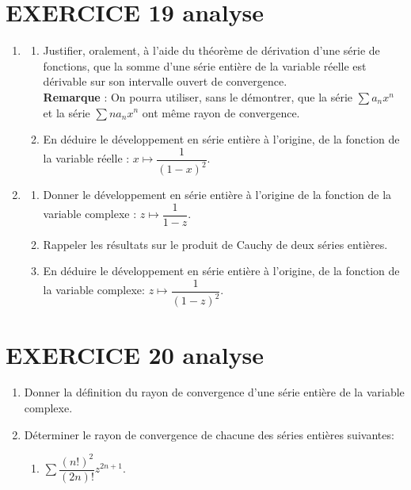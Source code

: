 \documentclass[10pt,oneside]{article}
\begin{document}
\begin{flushleft}
\section*{EXERCICE 19 \:analyse }

\begin{enumerate}
\item
\begin{enumerate}
\item
Justifier, oralement,  à l'aide du théorème de dérivation d'une série de fonctions, que la somme d'une série entière de la variable réelle est dérivable sur son intervalle ouvert de convergence.\\
\textbf{Remarque} : On pourra utiliser, sans le démontrer,   que  la série $\displaystyle\sum a_nx^n$ et la série $\displaystyle\sum na_nx^n$ ont même rayon de convergence.

\item
En déduire le développement en série entière à l'origine,  de la fonction de la variable réelle : $x\longmapsto \dfrac{1}{(1-x)^2}$.  
\end{enumerate}
\item
\begin{enumerate}
\item
Donner  le développement en série entière à l'origine de la fonction de la variable complexe : $z\longmapsto \dfrac{1}{1-z}$. \:
\item
Rappeler les résultats sur le produit de Cauchy de deux séries entières. \:\:\:\:
\item
En déduire le développement en série entière à l'origine, de la fonction de la variable complexe: $z\longmapsto \dfrac{1}{(1-z)^2}$.


\end{enumerate}
\end{enumerate}

\section*{EXERCICE 20 \:analyse }

\begin{enumerate}
\item Donner la définition du rayon de convergence d'une série entière de la variable complexe.


\item Déterminer le rayon de convergence de chacune des s\'{e}ries enti\`{e}res suivantes:

\begin{enumerate}
\item $\displaystyle\sum \dfrac{\left(n!\right)^{2}}{\left(2n\right)!}z^{2n+1}$. 



\end{enumerate}
\end{enumerate}
\end{flushleft}
\end{document}
